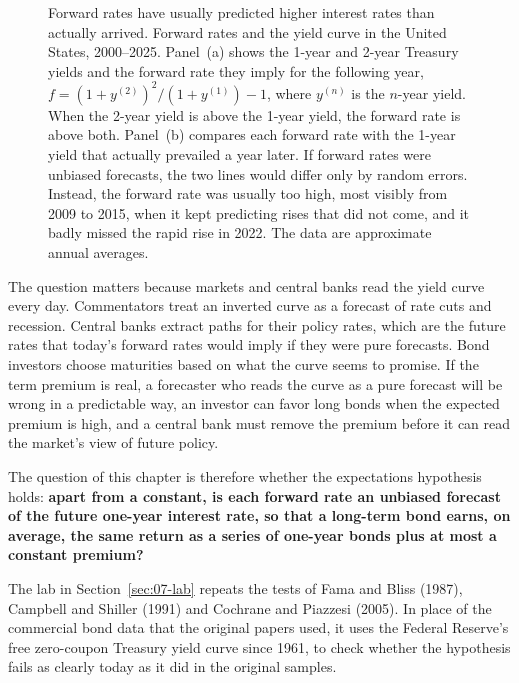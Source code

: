 \begin{figure}[htbp]
{%
}
\caption{Forward rates have usually predicted higher interest rates than actually arrived. Forward rates and the yield curve in the United States, 2000--2025. Panel~(a) shows the 1-year and 2-year Treasury yields and the forward rate they imply for the following year, $f = (1 + y^{(2)})^2 / (1 + y^{(1)}) - 1$, where $y^{(n)}$ is the $n$-year yield. When the 2-year yield is above the 1-year yield, the forward rate is above both. Panel~(b) compares each forward rate with the 1-year yield that actually prevailed a year later. If forward rates were unbiased forecasts, the two lines would differ only by random errors. Instead, the forward rate was usually too high, most visibly from 2009 to 2015, when it kept predicting rises that did not come, and it badly missed the rapid rise in 2022. The data are approximate annual averages.}
\label{fig:07-forward2}
\end{figure}


The question matters because markets and central banks read the yield curve every day. Commentators treat an inverted curve as a forecast of rate cuts and recession. Central banks extract  paths for their policy rates, which are the future rates that today's forward rates would imply if they were pure forecasts. Bond investors choose maturities based on what the curve seems to promise. If the term premium is real, a forecaster who reads the curve as a pure forecast will be wrong in a predictable way, an investor can favor long bonds when the expected premium is high, and a central bank must remove the premium before it can read the market's view of future policy.

The question of this chapter is therefore whether the expectations hypothesis holds: \textbf{apart from a constant, is each forward rate an unbiased forecast of the future one-year interest rate, so that a long-term bond earns, on average, the same return as a series of one-year bonds plus at most a constant premium?}

The lab in Section~\ref{sec:07-lab} repeats the tests of Fama and Bliss (1987), Campbell and Shiller (1991) and Cochrane and Piazzesi (2005). In place of the commercial bond data that the original papers used, it uses the Federal Reserve's free zero-coupon Treasury yield curve since 1961, to check whether the hypothesis fails as clearly today as it did in the original samples.


